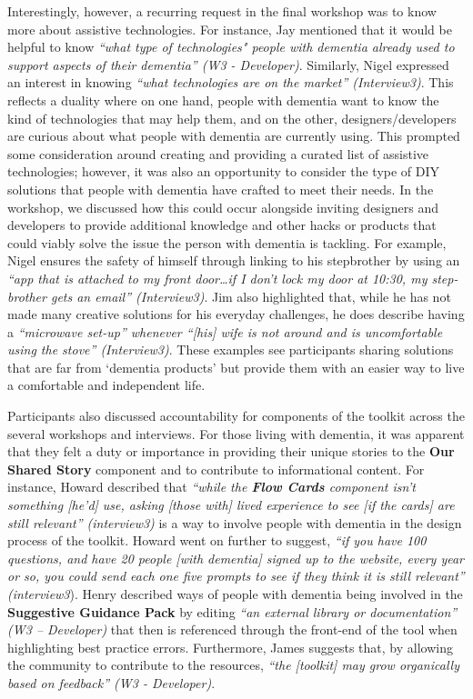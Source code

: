 Interestingly, however, a recurring request in the final workshop was to know more about assistive technologies. For instance, Jay mentioned that it would be helpful to know \textit{``what type of technologies" people with dementia already used to support aspects of their dementia'' (W3 - Developer)}. Similarly, Nigel expressed an interest in knowing \textit{``what technologies are on the market'' (Interview3)}. This reflects a duality where on one hand, people with dementia want to know the kind of technologies that may help them, and on the other, designers/developers are curious about what people with dementia are currently using. This prompted some consideration around creating and providing a curated list of assistive technologies; however, it was also an opportunity to consider the type of DIY solutions that people with dementia have crafted to meet their needs. In the workshop, we discussed how this could occur alongside inviting designers and developers to provide additional knowledge and other hacks or products that could viably solve the issue the person with dementia is tackling. For example, Nigel ensures the safety of himself through linking to his stepbrother by using an \textit{``app that is attached to my front door…if I don’t lock my door at 10:30, my step-brother gets an email'' (Interview3)}. Jim also highlighted that, while he has not made many creative solutions for his everyday challenges, he does describe having a \textit{``microwave set-up” whenever “[his] wife is not around and is uncomfortable using the stove'' (Interview3)}. These examples see participants sharing solutions that are far from ‘dementia products’ but provide them with an easier way to live a comfortable and independent life.

Participants also discussed accountability for components of the toolkit across the several workshops and interviews. For those living with dementia, it was apparent that they felt a duty or importance in providing their unique stories to the \textbf{Our Shared Story} component and to contribute to informational content. For instance, Howard described that \textit{``while the \textbf{Flow Cards} component isn't something [he'd] use, asking [those with] lived experience to see [if the cards] are still relevant'' (interview3)} is a way to involve people with dementia in the design process of the toolkit. Howard went on further to suggest, \textit{``if you have 100 questions, and have 20 people [with dementia] signed up to the website, every year or so, you could send each one five prompts to see if they think it is still relevant'' (interview3}). Henry described ways of people with dementia being involved in the \textbf{Suggestive Guidance Pack} by editing \textit{``an external library or documentation'' (W3 – Developer)} that then is referenced through the front-end of the tool when highlighting best practice errors. Furthermore, James suggests that, by allowing the community to contribute to the resources, \textit{``the [toolkit] may grow organically based on feedback'' (W3 - Developer)}. 

